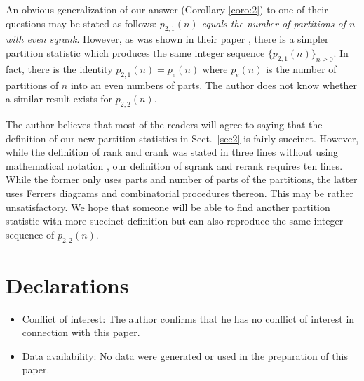 \documentclass[sn-mathphys-num]{sn-jnl}%
\theoremstyle{thmstyleone}%
\theoremstyle{thmstyletwo}%
\theoremstyle{thmstylethree}%
\begin{document}
An obvious generalization of our answer (Corollary \ref{coro:2}) 
to one of their questions \cite[p.~9, Question II]{AN2020}
may be stated as follows: {\em $p_{2,1}(n)$ equals the number of partitions of $n$ with even sqrank}.
However, as was shown in their paper \cite[Theorem 4]{AN2020}, 
there is a simpler partition statistic which produces the same integer sequence $\{p_{2,1}(n) \}_{n \geq 0}$.
In fact, there is the identity $p_{2,1}(n) = p_e(n)$ where $p_e(n)$ is the number of partitions of $n$
into an even numbers of parts.
The author does not know whether a similar result exists for $p_{2,2}(n)$.

The author believes that most of the readers will agree to saying that 
the definition of our new partition statistics in Sect.~\ref{sec2} is fairly succinct.
However, while the definition of rank and crank was stated in three lines
without using mathematical notation \cite{AN2020}, 
our definition of sqrank and rerank requires ten lines. 
While the former only uses parts and number of parts of the partitions,
the latter uses Ferrers diagrams and combinatorial procedures thereon. 
This may be rather unsatisfactory.
We hope that someone will be able to find another partition statistic with more succinct
definition but can also reproduce the same integer sequence of $p_{2,2}(n)$.

\backmatter




\section*{Declarations}

\begin{itemize}
\item Conflict of interest: The author confirms that he has no conflict of interest
in connection with this paper.
\item Data availability: No data were generated or used in the preparation of this
paper.
\end{itemize}

\end{document}

